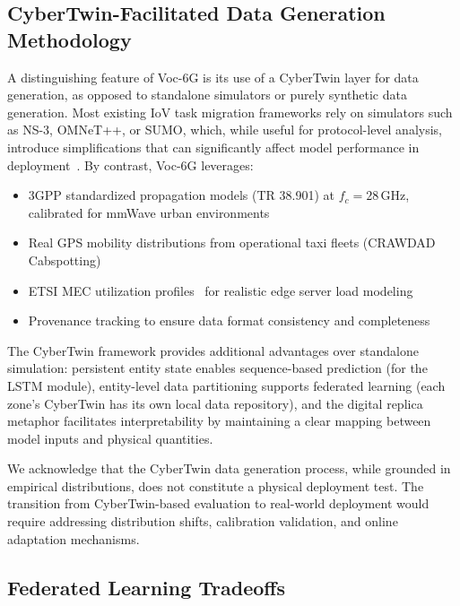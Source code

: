 \documentclass[journal,twoside]{IEEEtran}
\newcommand{\VocSixG}{Voc-6G}
\begin{document}
\subsection{CyberTwin-Facilitated Data Generation Methodology}

A distinguishing feature of \VocSixG{} is its use of a CyberTwin layer for data generation, as opposed to standalone simulators or purely synthetic data generation. Most existing IoV task migration frameworks rely on simulators such as NS-3, OMNeT++, or SUMO, which, while useful for protocol-level analysis, introduce simplifications that can significantly affect model performance in deployment~\cite{hou2018mobile}. By contrast, \VocSixG{} leverages:

\begin{itemize}
    \item 3GPP standardized propagation models (TR 38.901) at $f_c=28$\,GHz, calibrated for mmWave urban environments
    \item Real GPS mobility distributions from operational taxi fleets (CRAWDAD Cabspotting)
    \item ETSI MEC utilization profiles~\cite{etsi_mec003} for realistic edge server load modeling
    \item Provenance tracking to ensure data format consistency and completeness
\end{itemize}

The CyberTwin framework provides additional advantages over standalone simulation: persistent entity state enables sequence-based prediction (for the LSTM module), entity-level data partitioning supports federated learning (each zone's CyberTwin has its own local data repository), and the digital replica metaphor facilitates interpretability by maintaining a clear mapping between model inputs and physical quantities.

We acknowledge that the CyberTwin data generation process, while grounded in empirical distributions, does not constitute a physical deployment test. The transition from CyberTwin-based evaluation to real-world deployment would require addressing distribution shifts, calibration validation, and online adaptation mechanisms.

\subsection{Federated Learning Tradeoffs}
\end{document}
